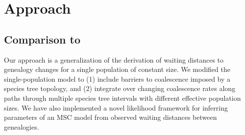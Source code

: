 \documentclass[11pt]{article}
\begin{document}














\section{Approach}
\subsection{Comparison to \citet{deng_distribution_2021}}

Our approach is a generalization of the \citet{deng_distribution_2021} derivation 
of waiting distances to genealogy changes for a single population of constant size. 
We modified the single-population model to (1) include barriers to coalescence imposed
by a species tree topology, and (2) integrate over changing coalescence rates along
paths through multiple species tree intervals with different effective population 
sizes. We have also implemented a novel likelihood framework for inferring 
parameters of an MSC model from observed waiting distances between genealogies.
\end{document}
